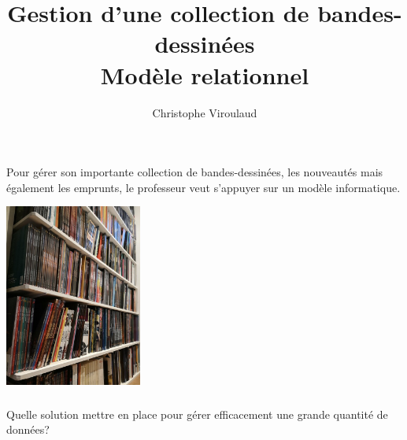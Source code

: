 \documentclass[svgnames,11pt]{beamer}
\author[]{Christophe Viroulaud}
\title{Gestion d'une collection de bandes-dessinées\\Modèle relationnel}
\date{\framebox{\textbf{BDD 01}}}
\institute{Terminale - NSI}
\begin{document}
\begin{frame}
    \titlepage
\end{frame}
\begin{frame}
    \frametitle{}

    Pour gérer son importante collection de bandes-dessinées, les nouveautés mais également les emprunts, le professeur veut s'appuyer sur un modèle informatique.
    \begin{center}
        \centering
        \includegraphics[width=4.5cm]{ressources/biblio.jpg}
        \label{IMG}
    \end{center}

\end{frame}
\begin{frame}
    \frametitle{}

    \begin{framed}
        Quelle solution mettre en place pour gérer efficacement une grande quantité de données?
    \end{framed}

\end{frame}
\end{document}
